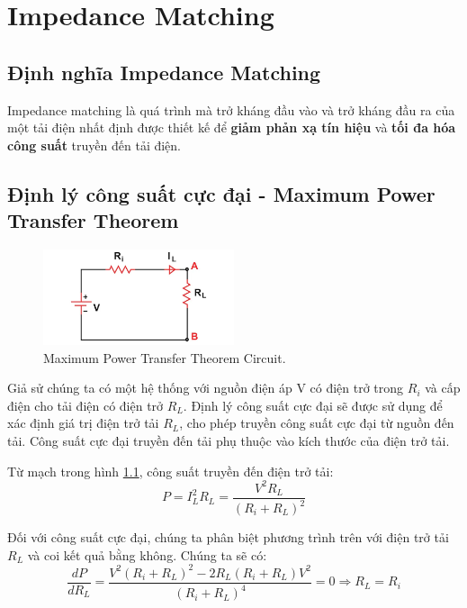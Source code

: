 \chapter{Impedance Matching}
    \section{Định nghĩa Impedance Matching}
        Impedance matching là quá trình mà trở kháng đầu vào và trở kháng đầu ra 
        của một tải điện nhất định được thiết kế để \textbf{giảm phản xạ tín hiệu} và 
        \textbf{tối đa hóa công suất} truyền đến tải điện.\cite{allaboutcircuits_impedance}
    
    \section{Định lý công suất cực đại - Maximum Power Transfer Theorem}
        \begin{figure}[h]
            \centering
            \includegraphics[width=0.5\textwidth]{figures/max_power_transfer_circuit.png}
            \caption{Maximum Power Transfer Theorem Circuit.}
            \label{fig:max_power_transfer_circuit}
        \end{figure}

        Giả sử chúng ta có một hệ thống với nguồn điện áp V có điện trở trong $R_i$ và cấp điện cho tải điện có điện trở $R_L$. 
        Định lý công suất cực đại sẽ được sử dụng để xác định giá trị điện trở tải $R_L$, 
        cho phép truyền công suất cực đại từ nguồn đến tải. 
        Công suất cực đại truyền đến tải phụ thuộc vào kích thước của điện trở tải.\par

        Từ mạch trong hình \ref{fig:max_power_transfer_circuit}, công suất truyền đến điện trở tải:
        \begin{equation}
            P = I_L^2 R_L = \frac{V^2 R_L}{(R_i + R_L)^2}
        \end{equation}

        Đối với công suất cực đại, chúng ta phân biệt phương trình trên với điện trở tải $R_L$ và coi kết quả bằng không. 
        Chúng ta sẽ có:
        \begin{equation}
            \frac{dP}{dR_L} = \frac{V^2 (R_i + R_L)^2 - 2R_L (R_i + R_L) V^2}{(R_i + R_L)^4} = 0 \Rightarrow R_L = R_i
        \end{equation}

